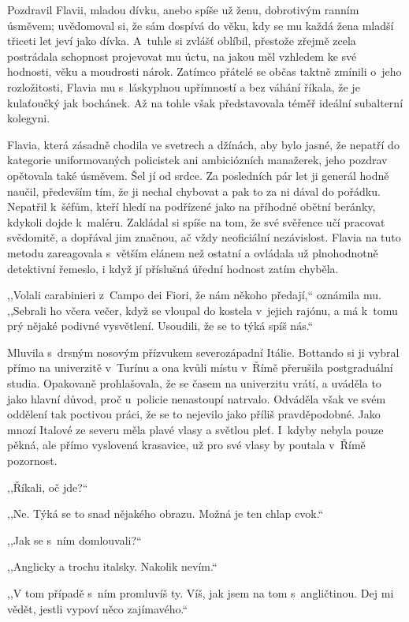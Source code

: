 Pozdravil Flavii, mladou dívku, anebo spíše už ženu, dobrotivým ranním úsměvem; uvědomoval si, že sám dospívá do věku, kdy se mu každá žena mladší třiceti let jeví jako dívka. A~tuhle si zvlášť oblíbil, přestože zřejmě zcela postrádala schopnost projevovat mu úctu, na jakou měl vzhledem ke své hodnosti, věku a moudrosti nárok. Zatímco přátelé se občas taktně zmínili o~jeho rozložitosti, Flavia mu s láskyplnou upřímností a bez váhání říkala, že je kulaťoučký jak bochánek. Až na tohle však představovala téměř ideální subalterní kolegyni. 

Flavia, která zásadně chodila ve svetrech a džínách, aby bylo jasné, že nepatří do kategorie uniformovaných policistek ani ambiciózních manažerek, jeho pozdrav opětovala také úsměvem. Šel jí od srdce. Za posledních pár let ji generál hodně naučil, především tím, že ji nechal chybovat a pak to za ni dával do pořádku. Nepatřil k šéfům, kteří hledí na podřízené jako na příhodné obětní beránky, kdykoli dojde k maléru. Zakládal si spíše na tom, že své svěřence učí pracovat svědomitě, a dopřával jim značnou, ač vždy neoficiální nezávislost. Flavia na tuto metodu zareagovala s větším elánem než ostatní a ovládala už plnohodnotně detektivní řemeslo, i když jí příslušná úřední hodnost zatím chyběla.

,,Volali carabinieri z Campo dei Fiori, že nám někoho předají,`` oznámila mu. ,,Sebrali ho včera večer, když se vloupal do kostela v jejich rajónu, a má k tomu prý nějaké podivné vysvětlení. Usoudili, že se to týká spíš nás.``

Mluvila s drsným nosovým přízvukem severozápadní Itálie. Bottando si ji vybral přímo na univerzitě v Turínu a ona kvůli místu v Římě přerušila postgraduální studia. Opakovaně prohlašovala, že se časem na univerzitu vrátí, a uváděla to jako hlavní důvod, proč u~policie nenastoupí natrvalo. Odváděla však ve svém oddělení tak poctivou práci, že se to nejevilo jako příliš pravděpodobné. Jako mnozí Italové ze severu měla plavé vlasy a světlou pleť. I~kdyby nebyla pouze pěkná, ale přímo vyslovená krasavice, už pro své vlasy by poutala v Římě pozornost.

,,Říkali, oč jde?``

,,Ne. Týká se to snad nějakého obrazu. Možná je ten chlap cvok.``

,,Jak se s ním domlouvali?``

,,Anglicky a trochu italsky. Nakolik nevím.``

,,V tom případě s ním promluvíš ty. Víš, jak jsem na tom s angličtinou. Dej mi vědět, jestli vypoví něco zajímavého.``

